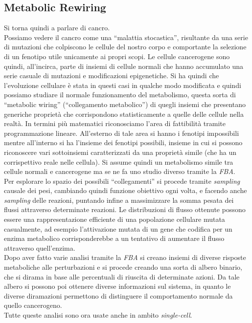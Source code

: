 \documentclass[a4paper,12pt, oneside]{book}
\begin{document}
\subsection{Metabolic Rewiring}
Si torna quindi a parlare di cancro.\\
Possiamo vedere il cancro come una ``malattia stocastica'', risultante da una
serie di mutazioni che colpiscono le cellule del nostro corpo e comportante la
selezione di un fenotipo utile unicamente ai propri scopi. Le cellule
cancerogene sono quindi, all'incirca, parte di insiemi di cellule normali
che hanno accumulato una serie casuale di mutazioni e modificazioni
epigenetiche. Si ha quindi che l'evoluzione cellulare è stata in questi casi in
qualche modo modificata e quindi possiamo studiare il normale funzionamento del
metabolismo, questa sorta di ``metabolic wiring'' (``collegamento metabolico'')
di 
quegli insiemi che presentano generiche proprietà che corrispondono
statisticamente a quelle delle cellule nella realtà. In termini più matematici
riconosciamo l'area di fattibilità tramite programmazione lineare. All'esterno
di tale area si hanno i fenotipi impossibili mentre all'interno si ha l'insieme
dei fenotipi possibili, insieme in cui si possono riconoscere vari sottoinsiemi
caratterizzati da una proprietà simile (che ha un corrispettivo reale nelle
cellula). Si assume quindi un metabolismo simile tra cellule normali e
cancerogene ma se ne fa uno studio diverso tramite la \textit{FBA}.\\
Per esplorare lo spazio dei possibili ``collegamenti'' si procede tramite
\textit{sampling} causale dei pesi, cambiando quindi funzione obiettivo ogni
volta, e facendo anche \textit{sampling} delle reazioni, puntando infine a
massimizzare la somma pesata dei flussi attraverso determinate reazioni. Le
distribuzioni di flusso ottenute possono essere una rappresentazione efficiente
di una popolazione cellulare mutata casualmente, ad esempio l'attivazione
mutata di un gene che codifica per un enzima metabolico corrisponderebbe a
un tentativo di aumentare il flusso attraverso quell'enzima. \\
Dopo aver fatto varie analisi tramite la \textit{FBA} si creano insiemi di
diverse risposte metaboliche alle perturbazioni e si procede creando una sorta
di albero binario, che si dirama in base alle percentuali di riuscita di
determinate azioni. Da tale albero si possono poi ottenere diverse informazioni
sul sistema, in quanto le diverse diramazioni permettono di distinguere il
comportamento normale da quello cancerogeno.\\
Tutte queste analisi sono ora usate anche in ambito \textit{single-cell}.
\end{document}
